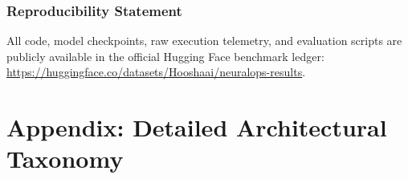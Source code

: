 \documentclass{article}
\begin{document}
\subsubsection*{Reproducibility Statement}
All code, model checkpoints, raw execution telemetry, and evaluation scripts are publicly available in the official Hugging Face benchmark ledger: \url{https://huggingface.co/datasets/Hooshaai/neuralops-results}.




\newpage
\appendix
\section{Appendix: Detailed Architectural Taxonomy}
\label{sec:appendix_taxonomy}
\end{document}
